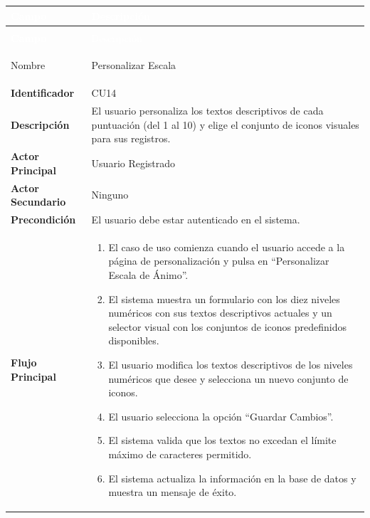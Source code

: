 \begingroup
\small 
\renewcommand{\arraystretch}{1.4}
\begin{xltabular}{\textwidth}{|>{\bfseries}p{3.5cm}|X|}
    \textcolor{white}{Campo} & \textcolor{white}{Descripción} \\ \hline
    \endfirsthead

     \\
    \hline
    \textcolor{white}{Campo} & \textcolor{white}{Descripción} \\ \hline
    \endhead

    Nombre & Personalizar Escala \\ \hline
    Identificador & CU14 \\ \hline
    Descripción & El usuario personaliza los textos descriptivos de cada puntuación (del 1 al 10) y elige el conjunto de iconos visuales para sus registros. \\ \hline
    Actor Principal & Usuario Registrado \\ \hline
    Actor Secundario & Ninguno \\ \hline
    Precondición & El usuario debe estar autenticado en el sistema. \\ \hline
    Flujo Principal & 
    \begin{enumerate}[leftmargin=0.5cm, topsep=0pt, partopsep=0pt, parsep=0pt, itemsep=4pt]
        \item El caso de uso comienza cuando el usuario accede a la página de personalización y pulsa en ``Personalizar Escala de Ánimo''.
        \item El sistema muestra un formulario con los diez niveles numéricos con sus textos descriptivos actuales y un selector visual con los conjuntos de iconos predefinidos disponibles.
        \item El usuario modifica los textos descriptivos de los niveles numéricos que desee y selecciona un nuevo conjunto de iconos.
        \item El usuario selecciona la opción ``Guardar Cambios''.
        \item El sistema valida que los textos no excedan el límite máximo de caracteres permitido.
        \item El sistema actualiza la información en la base de datos y muestra un mensaje de éxito.
    \end{enumerate} 
    \\ \hline

\end{xltabular}
